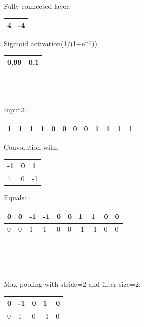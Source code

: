 \documentclass{article}
\begin{document}
 

 

 Fully connected layer:

\begin{tabular}{|p{0.4in}|p{0.4in}|} \hline 
4 & -4 \\ \hline 
\end{tabular}

 Sigmoid activation(1/(1+e${}^{-x}$))=

\begin{tabular}{|p{0.4in}|p{0.4in}|} \hline 
0.99 & 0.1 \\ \hline 
\end{tabular}\\
\\~\\

Input2:\\

\begin{tabular}{|p{0.2in}|p{0.2in}|p{0.2in}|p{0.2in}|p{0.2in}|p{0.2in}|p{0.2in}|p{0.2in}|p{0.2in}|p{0.2in}|p{0.2in}|p{0.2in}|} \hline 
1 & 1 & 1 & 1 & 0 & 0 & 0 & 0 & 1 & 1 & 1 & 1 \\ \hline 
\end{tabular}

Convolution with: 

\begin{tabular}{|p{0.3in}|p{0.3in}|p{0.3in}|} \hline 
-1 & 0 & 1 \\ \hline 
1 & 0 & -1 \\ \hline  
\end{tabular}

 Equals:

\begin{tabular}{|p{0.3in}|p{0.3in}|p{0.3in}|p{0.3in}|p{0.3in}|p{0.3in}|p{0.3in}|p{0.3in}|p{0.3in}|p{0.3in}|} \hline 
0 & 0 & -1 & -1 & 0 & 0 & 1 & 1 & 0 & 0 \\ \hline 
0 & 0 & 1 & 1 & 0 & 0 & -1 & -1 & 0 & 0 \\ \hline 
\end{tabular}\\
\\~

Max pooling with stride=2 and filter size=2:

  

\begin{tabular}{|p{0.5in}|p{0.5in}|p{0.5in}|p{0.5in}|p{0.5in}|} \hline 
0 & -1 & 0 & 1 & 0 \\ \hline 
0 & 1 & 0 & -1 & 0 \\ \hline 
\end{tabular}
\end{document}
